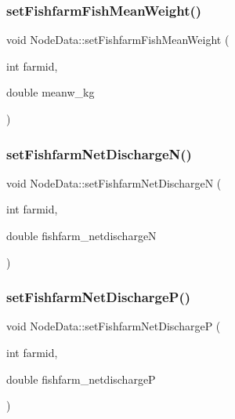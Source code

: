 \subsubsection{\texorpdfstring{setFishfarmFishMeanWeight()}{setFishfarmFishMeanWeight()}}
{\footnotesize\ttfamily void Node\+Data\+::set\+Fishfarm\+Fish\+Mean\+Weight (\begin{DoxyParamCaption}\item[{int}]{farmid,  }\item[{double}]{meanw\+\_\+kg }\end{DoxyParamCaption})}

\mbox{\label{class_node_data_a4f83b327f42474a893ac884c155c711a}} 
\subsubsection{\texorpdfstring{setFishfarmNetDischargeN()}{setFishfarmNetDischargeN()}}
{\footnotesize\ttfamily void Node\+Data\+::set\+Fishfarm\+Net\+DischargeN (\begin{DoxyParamCaption}\item[{int}]{farmid,  }\item[{double}]{fishfarm\+\_\+netdischargeN }\end{DoxyParamCaption})}

\mbox{\label{class_node_data_ac37c193019be503886c443c359f65972}} 
\subsubsection{\texorpdfstring{setFishfarmNetDischargeP()}{setFishfarmNetDischargeP()}}
{\footnotesize\ttfamily void Node\+Data\+::set\+Fishfarm\+Net\+DischargeP (\begin{DoxyParamCaption}\item[{int}]{farmid,  }\item[{double}]{fishfarm\+\_\+netdischargeP }\end{DoxyParamCaption})}

\mbox{\label{class_node_data_a4e6336f20ffda13091cd79becaca6e30}} 
